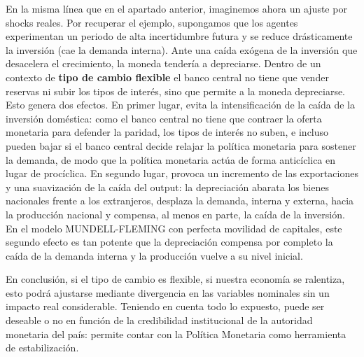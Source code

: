 \documentclass[10pt,a4paper]{article}
\begin{document}
En la misma línea que en el apartado anterior, imaginemos ahora un ajuste por shocks reales. Por recuperar el ejemplo, supongamos que los agentes experimentan un periodo de alta incertidumbre futura y se reduce drásticamente la inversión (cae la demanda interna). Ante una caída exógena de la inversión que desacelera el crecimiento, la moneda tendería a depreciarse. Dentro de un contexto de \textbf{tipo de cambio flexible} el banco central no tiene que vender reservas ni subir los tipos de interés, sino que permite a la moneda depreciarse. Esto genera dos efectos. En primer lugar, evita la intensificación de la caída de la inversión doméstica: como el banco central no tiene que contraer la oferta monetaria para defender la paridad, los tipos de interés no suben, e incluso pueden bajar si el banco central decide relajar la política monetaria para sostener la demanda, de modo que la política monetaria actúa de forma anticíclica en lugar de procíclica. En segundo lugar, provoca un incremento de las exportaciones y una suavización de la caída del output: la depreciación abarata los bienes nacionales frente a los extranjeros, desplaza la demanda, interna y externa, hacia la producción nacional y compensa, al menos en parte, la caída de la inversión. En el modelo MUNDELL-FLEMING con perfecta movilidad de capitales, este segundo efecto es tan potente que la depreciación compensa por completo la caída de la demanda interna y la producción vuelve a su nivel inicial.

En conclusión, si el tipo de cambio es flexible, si nuestra economía se ralentiza, esto podrá ajustarse mediante divergencia en las variables nominales sin un impacto real considerable. Teniendo en cuenta todo lo expuesto, puede ser deseable o no en función de la credibilidad institucional de la autoridad monetaria del país: permite contar con la Política Monetaria como herramienta de estabilización.
\end{document}
